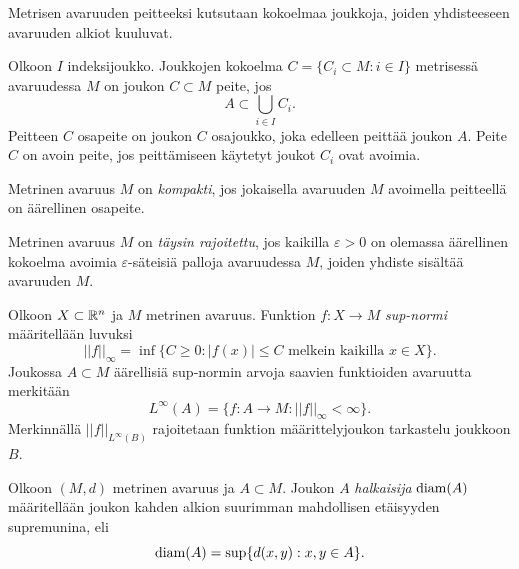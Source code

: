 \documentclass[12pt,oneside,a4paper]{amsbook} %
\begin{document}
Metrisen avaruuden peitteeksi kutsutaan kokoelmaa joukkoja, joiden yhdisteeseen avaruuden alkiot kuuluvat.

\begin{definition}
    Olkoon $I$ indeksijoukko. Joukkojen kokoelma $C = \{C_i \subset M \colon i \in I\}$ metrisessä avaruudessa $M$ on joukon $C \subset M$ peite, jos 
    \begin{equation*}
        A \subset \bigcup_{i\in I}C_i.
    \end{equation*}
    Peitteen $C$ osapeite on joukon $C$ osajoukko, joka edelleen peittää joukon $A$. Peite $C$ on avoin peite, jos peittämiseen käytetyt joukot $C_i$ ovat avoimia. 
\end{definition}



\begin{definition}
    Metrinen avaruus $M$ on \textit{kompakti}, jos jokaisella avaruuden $M$ avoimella peitteellä on äärellinen osapeite. 
\end{definition}

\begin{definition}
    Metrinen avaruus $M$ on \textit{täysin rajoitettu}, jos kaikilla $\varepsilon > 0$ on olemassa äärellinen kokoelma avoimia $\varepsilon$-säteisiä palloja avaruudessa $M$, joiden yhdiste sisältää avaruuden $M$.
\end{definition}

\begin{definition}
Olkoon $X\subset \mathbb{R}^n$ ja $M$ metrinen avaruus. Funktion $f: X \to M$ \textit{sup-normi} määritellään luvuksi
\begin{equation*}
    ||f||_\infty = \inf\{C \ge 0 : |f(x)| \le C \text{ melkein kaikilla } x \in X\}.
\end{equation*}
Joukossa $A\subset M$ äärellisiä sup-normin arvoja saavien funktioiden avaruutta merkitään
    \[L^\infty (A) = \{f:A\to M \colon  ||f||_\infty < \infty\}.\] 
Merkinnällä $||f||_{L^\infty(B)}$ rajoitetaan funktion määrittelyjoukon tarkastelu joukkoon $B$.
\end{definition}

\begin{definition}
    Olkoon $(M, d)$ metrinen avaruus ja $A \subset M$. Joukon $A$ \textit{halkaisija} $\operatorname{diam}(A)$ määritellään joukon kahden alkion suurimman mahdollisen etäisyyden supremunina, eli
    \begin{equation*}
        \operatorname{diam}(A) = \sup\{d(x, y) : x,y \in A\}.
    \end{equation*}
\end{definition}
\end{document}
